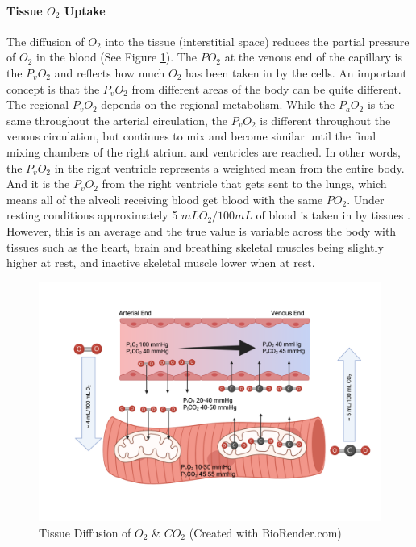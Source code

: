 \paragraph{Tissue $O_2$ Uptake}

The diffusion of $O_2$ into the tissue (interstitial space) reduces the partial pressure of $O_2$ in the blood (See Figure \ref{fig:tissue_diffusion}). The $PO_2$ at the venous end of the capillary is the $P_vO_2$ and reflects how much $O_2$ has been taken in by the cells. An important concept is that the $P_vO_2$ from different areas of the body can be quite different. The regional $P_vO_2$ depends on the regional metabolism. While the $P_aO_2$ is the same throughout the arterial circulation, the $P_vO_2$ is different throughout the venous circulation, but continues to mix and become similar until the final mixing chambers of the right atrium and ventricles are reached. In other words, the $P_vO_2$ in the right ventricle represents a weighted mean from the entire body. And it is the $P_vO_2$ from the right ventricle that gets sent to the lungs, which means all of the alveoli receiving blood get blood with the same $PO_2$. Under resting conditions approximately 5 $mL O_2 / 100 mL$ of blood is taken in by tissues \cite{hall_guyton_2020}. However, this is an average and the true value is variable across the body with tissues such as the heart, brain and breathing skeletal muscles being slightly higher at rest, and inactive skeletal muscle lower when at rest.

\begin{figure}[!h]
    \centering
    \includegraphics[width=1.0\linewidth]{./figure/tissue_diffusion.png}
    \caption{Tissue Diffusion of $O_2$ \& $CO_2$ \footnotesize{(Created with BioRender.com)}}
    \label{fig:tissue_diffusion}
\end{figure}

